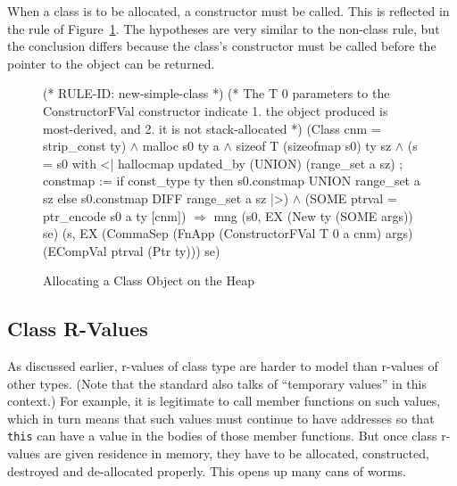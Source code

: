 \documentclass[11pt]{article}
\begin{document}
When a class is to be allocated, a constructor must be called.  This
is reflected in the rule of Figure~\ref{fig:new-simple-class}.   The
hypotheses are very similar to the non-class rule, but the conclusion
differs because the class's constructor must be called before the
pointer to the object can be returned.
\begin{figure}[htbp]
\begin{stdrule}
(* RULE-ID: new-simple-class *)
(* The T 0 parameters to the ConstructorFVal constructor indicate
    1. the object produced is most-derived, and
    2. it is not stack-allocated
*)
     (Class cnm = strip_const ty) \(\land\)
     malloc s0 ty a \(\land\)
     sizeof T (sizeofmap s0) ty sz \(\land\)
     (s = s0 with <|
             hallocmap updated_by (UNION) (range_set a sz) ;
             constmap := if const_type ty then
                           s0.constmap UNION range_set a sz
                         else s0.constmap DIFF range_set a sz
          |>) \(\land\)
     (SOME ptrval = ptr_encode s0 a ty [cnm])
   \(\Rightarrow\)
     mng (s0, EX (New ty (SOME args)) se)
         (s, EX (CommaSep (FnApp (ConstructorFVal T 0 a cnm) args)
                          (ECompVal ptrval (Ptr ty)))
                se)
\end{stdrule}
\caption{Allocating a Class Object on the Heap}
\label{fig:new-simple-class}
\end{figure}

\subsection{Class R-Values}
\label{sec:class-rvalues}

As discussed earlier, r-values of class type are harder to model than
r-values of other types.  (Note that the standard also talks of
``temporary values'' in this context.) For example, it is legitimate
to call member functions on such values, which in turn means that such
values must continue to have addresses so that \texttt{this} can have
a value in the bodies of those member functions.  But once class
r-values are given residence in memory, they have to be allocated,
constructed, destroyed and de-allocated properly.  This opens up many
cans of worms.
\end{document}
